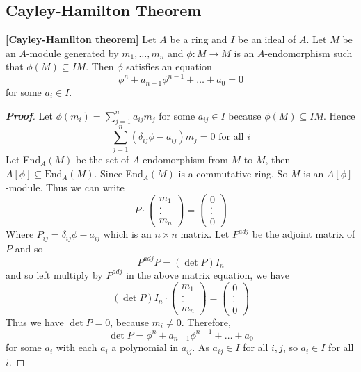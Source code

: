 \subsection{Cayley-Hamilton Theorem}
\begin{theorem}{\bf [Cayley-Hamilton theorem]}\label{C;Cayley} Let $A$ be a ring and $I$ be an ideal of $A$. Let $M$ be an $A$-module generated by $m_1,\ldots,m_n$ and $\phi: M \rightarrow M$ is an $A$-endomorphism such that
$\phi(M) \subseteq IM$. Then $\phi$ satisfies an equation
$$\phi^n+a_{n-1}\phi^{n-1}+\ldots+a_0=0$$
for some $a_i \in I$.
\end{theorem}
\begin{proof}[\bf Proof] Let $\phi(m_i)=\sum_{j=1}^n a_{ij}m_j$ for some $a_{ij} \in I$ because $\phi(M) \subseteq IM$.
Hence
$$\sum_{j=1}^n (\delta_{ij}\phi-a_{ij})m_j=0 \text{ for all } i$$
Let End$_A(M)$ be the set of $A$-endomorphism from $M$ to $M$, then $A[\phi] \subseteq \text{End}_A(M)$. Since
End$_A(M)$ is a commutative ring. So $M$ is an $A[\phi]$-module. Thus we can write
\begin{equation*} P\cdot \begin{pmatrix} m_1 \\ .\\.\\m_n \end{pmatrix} = \begin{pmatrix} 0\\.\\.\\0\end{pmatrix}
\end{equation*}
Where $P_{ij}=\delta_{ij}\phi - a_{ij}$ which is an $n \times n$ matrix.
Let $P^{adj}$ be the adjoint matrix of $P$ and so
$$P^{adj}P=(\det{P})I_n$$
and so left multiply by $P^{adj}$ in the above matrix equation, we have
\begin{equation*} (\det{P}) I_n \cdot \begin{pmatrix} m_1\\.\\.\\m_n \end{pmatrix}
=\begin{pmatrix} 0\\.\\.\\0 \end{pmatrix} \end{equation*}
Thus we have $\det{P}=0$, because $m_i \neq 0$. Therefore,
$$\det{P}=\phi^n+a_{n-1}\phi^{n-1}+\ldots +a_0$$ for some $a_i$ with each $a_i$ a polynomial in $a_{ij}$.
As $a_{ij} \in I$ for all $i,j$, so $a_i \in I$ for all $i$.
\end{proof}

